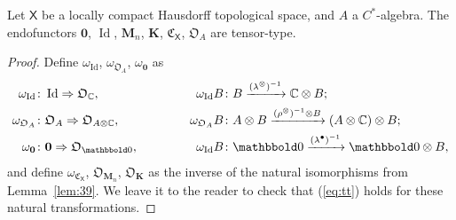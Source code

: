 \documentclass[10pt]{simplearticle}
\newcommand{\Id}{\operatorname{Id}}
\newcommand{\C}{\mathfrak{C}^{\,}}
\newcommand{\bzero}{\boldsymbol{0}}
\newcommand{\bbzero}{\mathbbold0}
\newcommand{\fK}{\mathbf{K}}
\newcommand{\fM}{\mathbf{M}}
\begin{document}
\begin{lem}
Let $\mathsf{X}$ be a locally compact Hausdorff topological space,
and $A$ a $C^{*}$-algebra. The endofunctors $\bzero$, $\Id$, $\fM_{n}$,
$\fK$, $\C_{\mathsf{X}}$, $\mathfrak{O}_{A}$ are tensor-type.
\end{lem}

\begin{proof}
Define $\omega_{\Id}$, $\omega_{\mathfrak{O}_{A}}$, $\omega_{\bzero}$
as
\begin{alignat*}{3}
\omega_{\Id} & \colon\Id\Rightarrow\mathfrak{O}_{\mathbb{C}}, & \qquad &\ 
& \omega_{\Id}B\colon & B\xrightarrow{(\lambda^{\otimes})^{-1}}\mathbb{C}\otimes B;\\
\omega_{\mathfrak{O}_{A}} & \colon\mathfrak{O}_{A}\Rightarrow\mathfrak{O}_{A\otimes\mathbb{C}}, & \qquad &\ 
& \omega_{\mathfrak{O}_{A}}B\colon & A\otimes B\xrightarrow{(\rho^{\otimes})^{-1}\otimes B}(A\otimes\mathbb{C})\otimes B;\\
\omega_{\bzero} & \colon\bzero\Rightarrow\mathfrak{O}_{\bbzero}, & \qquad &\ 
& \omega_{\Id}B\colon & \bbzero\xrightarrow{(\lambda^{\bullet})^{-1}}\bbzero\otimes B,
\end{alignat*}
and define $\omega_{\C_{\mathsf{X}}}$, $\mathfrak{O}_{\fM_{n}}$,
$\mathfrak{O}_{\fK}$ as the inverse of the natural isomorphisms from
Lemma~\ref{lem:39}. We leave it to the reader to check that (\ref{eq:tt})
holds for these natural transformations.
\end{proof}
\end{document}
